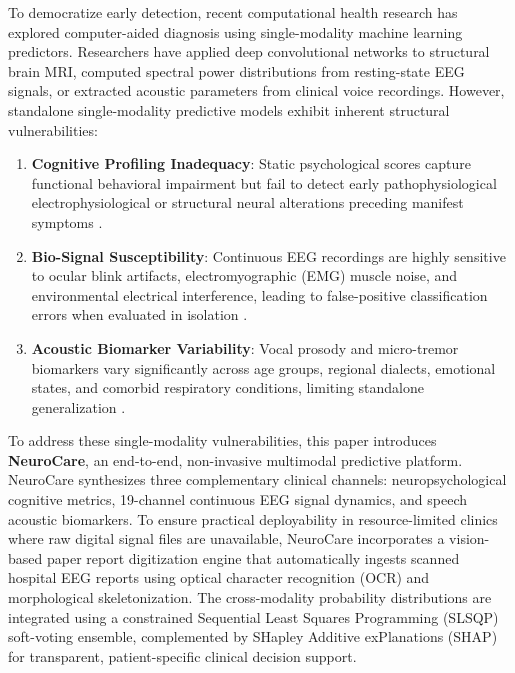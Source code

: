\documentclass[conference]{IEEEtran}
\begin{document}
To democratize early detection, recent computational health research has explored computer-aided diagnosis using single-modality machine learning predictors. Researchers have applied deep convolutional networks to structural brain MRI, computed spectral power distributions from resting-state EEG signals, or extracted acoustic parameters from clinical voice recordings. However, standalone single-modality predictive models exhibit inherent structural vulnerabilities:
\begin{enumerate}
    \item \textbf{Cognitive Profiling Inadequacy}: Static psychological scores capture functional behavioral impairment but fail to detect early pathophysiological electrophysiological or structural neural alterations preceding manifest symptoms \cite{battineni2021}.
    \item \textbf{Bio-Signal Susceptibility}: Continuous EEG recordings are highly sensitive to ocular blink artifacts, electromyographic (EMG) muscle noise, and environmental electrical interference, leading to false-positive classification errors when evaluated in isolation \cite{cassani2018}.
    \item \textbf{Acoustic Biomarker Variability}: Vocal prosody and micro-tremor biomarkers vary significantly across age groups, regional dialects, emotional states, and comorbid respiratory conditions, limiting standalone generalization \cite{cummins2020}.
\end{enumerate}

To address these single-modality vulnerabilities, this paper introduces \textbf{NeuroCare}, an end-to-end, non-invasive multimodal predictive platform. NeuroCare synthesizes three complementary clinical channels: neuropsychological cognitive metrics, 19-channel continuous EEG signal dynamics, and speech acoustic biomarkers. To ensure practical deployability in resource-limited clinics where raw digital signal files are unavailable, NeuroCare incorporates a vision-based paper report digitization engine that automatically ingests scanned hospital EEG reports using optical character recognition (OCR) and morphological skeletonization. The cross-modality probability distributions are integrated using a constrained Sequential Least Squares Programming (SLSQP) soft-voting ensemble, complemented by SHapley Additive exPlanations (SHAP) for transparent, patient-specific clinical decision support.
\end{document}
